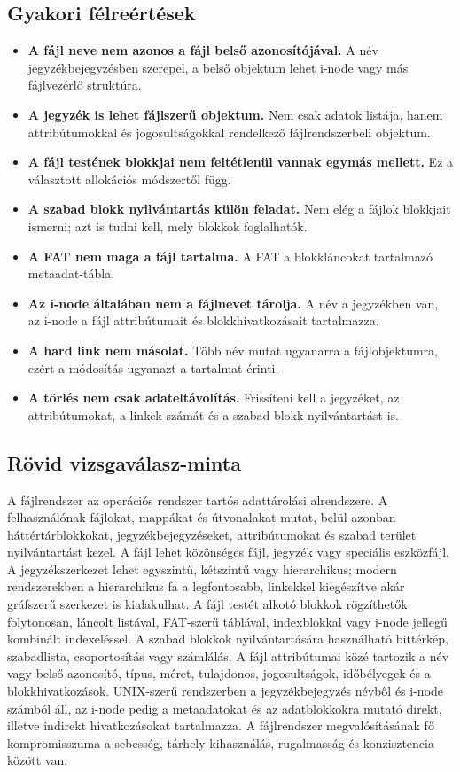 \subsection{Gyakori félreértések}

\begin{itemize}
  \item \textbf{A fájl neve nem azonos a fájl belső azonosítójával.} A név jegyzékbejegyzésben szerepel, a belső objektum lehet i-node vagy más fájlvezérlő struktúra.
  \item \textbf{A jegyzék is lehet fájlszerű objektum.} Nem csak adatok listája, hanem attribútumokkal és jogosultságokkal rendelkező fájlrendszerbeli objektum.
  \item \textbf{A fájl testének blokkjai nem feltétlenül vannak egymás mellett.} Ez a választott allokációs módszertől függ.
  \item \textbf{A szabad blokk nyilvántartás külön feladat.} Nem elég a fájlok blokkjait ismerni; azt is tudni kell, mely blokkok foglalhatók.
  \item \textbf{A FAT nem maga a fájl tartalma.} A FAT a blokkláncokat tartalmazó metaadat-tábla.
  \item \textbf{Az i-node általában nem a fájlnevet tárolja.} A név a jegyzékben van, az i-node a fájl attribútumait és blokkhivatkozásait tartalmazza.
  \item \textbf{A hard link nem másolat.} Több név mutat ugyanarra a fájlobjektumra, ezért a módosítás ugyanazt a tartalmat érinti.
  \item \textbf{A törlés nem csak adateltávolítás.} Frissíteni kell a jegyzéket, az attribútumokat, a linkek számát és a szabad blokk nyilvántartást is.
\end{itemize}

\subsection{Rövid vizsgaválasz-minta}

\begin{summarybox}
A fájlrendszer az operációs rendszer tartós adattárolási alrendszere. A felhasználónak fájlokat, mappákat és útvonalakat mutat, belül azonban háttértárblokkokat, jegyzékbejegyzéseket, attribútumokat és szabad terület nyilvántartást kezel. A fájl lehet közönséges fájl, jegyzék vagy speciális eszközfájl. A jegyzékszerkezet lehet egyszintű, kétszintű vagy hierarchikus; modern rendszerekben a hierarchikus fa a legfontosabb, linkekkel kiegészítve akár gráfszerű szerkezet is kialakulhat. A fájl testét alkotó blokkok rögzíthetők folytonosan, láncolt listával, FAT-szerű táblával, indexblokkal vagy i-node jellegű kombinált indexeléssel. A szabad blokkok nyilvántartására használható bittérkép, szabadlista, csoportosítás vagy számlálás. A fájl attribútumai közé tartozik a név vagy belső azonosító, típus, méret, tulajdonos, jogosultságok, időbélyegek és a blokkhivatkozások. UNIX-szerű rendszerben a jegyzékbejegyzés névből és i-node számból áll, az i-node pedig a metaadatokat és az adatblokkokra mutató direkt, illetve indirekt hivatkozásokat tartalmazza. A fájlrendszer megvalósításának fő kompromisszuma a sebesség, tárhely-kihasználás, rugalmasság és konzisztencia között van.
\end{summarybox}

